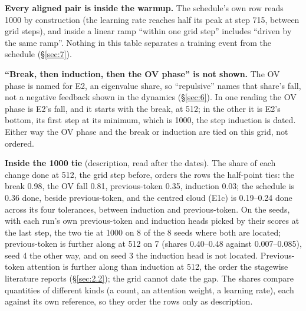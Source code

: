 \documentclass[11pt]{article}
\begin{document}
\textbf{Every aligned pair is inside the warmup.} The schedule's own row reads 1000 by construction (the learning rate reaches half its peak at step 715, between grid steps), and inside a linear ramp ``within one grid step'' includes ``driven by the same ramp''. Nothing in this table separates a training event from the schedule (\S\ref{sec:7}).

\textbf{``Break, then induction, then the OV phase'' is not shown.} The OV phase is named for E2, an eigenvalue share, so ``repulsive'' names that share's fall, not a negative feedback shown in the dynamics (\S\ref{sec:6}). In one reading the OV phase is E2's fall, and it starts with the break, at 512; in the other it is E2's bottom, its first step at its minimum, which is 1000, the step induction is dated. Either way the OV phase and the break or induction are tied on this grid, not ordered.

\textbf{Inside the 1000 tie} (description, read after the dates). The share of each change done at 512, the grid step before, orders the rows the half-point ties: the break 0.98, the OV fall 0.81, previous-token 0.35, induction 0.03; the schedule is 0.36 done, beside previous-token, and the centred cloud (E1c) is 0.19--0.24 done across its four tolerances, between induction and previous-token. On the seeds, with each run's own previous-token and induction heads picked by their scores at the last step, the two tie at 1000 on 8 of the 8 seeds where both are located; previous-token is further along at 512 on 7 (shares 0.40--0.48 against 0.007--0.085), seed 4 the other way, and on seed 3 the induction head is not located. Previous-token attention is further along than induction at 512, the order the stagewise literature reports (\S\ref{sec:2.2}); the grid cannot date the gap. The shares compare quantities of different kinds (a count, an attention weight, a learning rate), each against its own reference, so they order the rows only as description.
\end{document}
